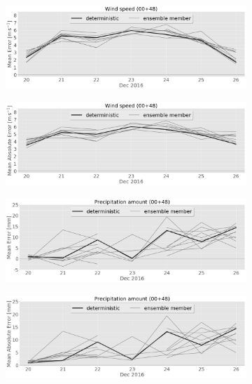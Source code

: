 \begin{figure}\ContinuedFloat
	\centering
		\begin{subfigure}[b]{0.49\textwidth}
			\includegraphics[width=\textwidth]{./fig_sfc_ws/ME_20161220_26_00}
			\caption{}\label{fig:bias:ws}
		\end{subfigure}
        \begin{subfigure}[b]{0.49\textwidth}
			\includegraphics[width=\textwidth]{./fig_sfc_ws/MAE_20161220_26_00}
			\caption{}\label{fig:MAE:ws}
		\end{subfigure}
		\begin{subfigure}[b]{0.49\textwidth}
			\includegraphics[width=\textwidth]{./fig_sfc_precip/ME_20161220_26_00}
			\caption{}\label{fig:bias:precip}
		\end{subfigure}
        \begin{subfigure}[b]{0.49\textwidth}
			\includegraphics[width=\textwidth]{./fig_sfc_precip/MAE_20161220_26_00}

\end{subfigure}
\end{figure}
